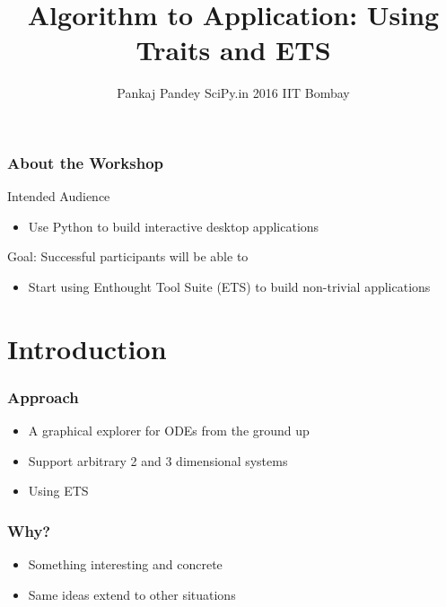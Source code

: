 \documentclass[14pt,compress]{beamer}
\title[Traits]{Algorithm to Application: \newline Using Traits and ETS}
\author[Pankaj] {Pankaj Pandey \newline SciPy.in 2016 \newline IIT Bombay}
\institute[] {\large \pgfimage[height=3em]{enthought-logo_lg}
}
\date[] {
\small
}
\begin{document}
\begin{frame}
  \maketitle
\end{frame}


\begin{frame}
  \frametitle{About the Workshop}
  \begin{block}{Intended Audience}
  \begin{itemize}
    \item Use Python to build interactive desktop applications
  \end{itemize}
  \end{block}  

  \begin{block}{Goal: Successful participants will be able to}
    \begin{itemize}
      \item Start using Enthought Tool Suite (ETS) to build non-trivial applications

    \end{itemize}
  \end{block}
\end{frame}

\section{Introduction}

\begin{frame}
  \frametitle{}
  \begin{center}
  \end{center}
\end{frame}

\begin{frame}
  \frametitle{Approach}
  \begin{itemize}
      \item A graphical explorer for ODEs \alert{from the ground up}
  \item Support arbitrary 2 and 3 dimensional systems
  \item Using ETS
 \end{itemize}
\end{frame}

\begin{frame}
  \frametitle{Why?}
  \begin{itemize}
  \item Something interesting and concrete
  \item Same ideas extend to other situations
 \end{itemize}
\end{frame}
\end{document}
